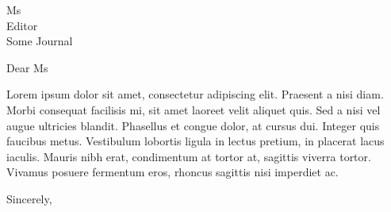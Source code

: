 \documentclass[xelatex]{GnuLetter}
\begin{document}
\begin{letter}{
Ms  \\  
Editor\\
Some Journal
}


\opening{Dear Ms } 


Lorem ipsum dolor sit amet, consectetur adipiscing elit. Praesent a nisi diam. Morbi consequat facilisis mi, sit amet laoreet velit aliquet quis. Sed a nisi vel augue ultricies blandit. Phasellus et congue dolor, at cursus dui. Integer quis faucibus metus. Vestibulum lobortis ligula in lectus pretium, in placerat lacus iaculis. Mauris nibh erat, condimentum at tortor at, sagittis viverra tortor. Vivamus posuere fermentum eros, rhoncus sagittis nisi imperdiet ac.



\closing{Sincerely,}

\end{letter}
\end{document}
